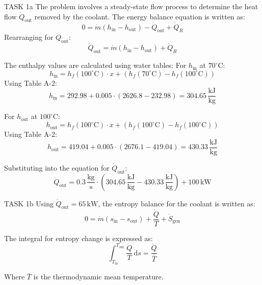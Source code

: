 TASK 1a  
The problem involves a steady-state flow process to determine the heat flow \( \dot{Q}_{\text{out}} \) removed by the coolant. The energy balance equation is written as:  
\[
0 = \dot{m} \left( h_{\text{in}} - h_{\text{out}} \right) - \dot{Q}_{\text{out}} + \dot{Q}_R
\]  
Rearranging for \( \dot{Q}_{\text{out}} \):  
\[
\dot{Q}_{\text{out}} = \dot{m} \left( h_{\text{in}} - h_{\text{out}} \right) + \dot{Q}_R
\]  

The enthalpy values are calculated using water tables:  
For \( h_{\text{in}} \) at \( 70^\circ\text{C} \):  
\[
h_{\text{in}} = h_f(100^\circ\text{C}) \cdot x + \left( h_f(70^\circ\text{C}) - h_f(100^\circ\text{C}) \right)
\]  
Using Table A-2:  
\[
h_{\text{in}} = 292.98 + 0.005 \cdot \left( 2626.8 - 232.98 \right) = 304.65 \, \frac{\text{kJ}}{\text{kg}}
\]  

For \( h_{\text{out}} \) at \( 100^\circ\text{C} \):  
\[
h_{\text{out}} = h_f(100^\circ\text{C}) \cdot x + \left( h_f(100^\circ\text{C}) - h_f(100^\circ\text{C}) \right)
\]  
Using Table A-2:  
\[
h_{\text{out}} = 419.04 + 0.005 \cdot \left( 2676.1 - 419.04 \right) = 430.33 \, \frac{\text{kJ}}{\text{kg}}
\]  

Substituting into the equation for \( \dot{Q}_{\text{out}} \):  
\[
\dot{Q}_{\text{out}} = 0.3 \, \frac{\text{kg}}{\text{s}} \cdot \left( 304.65 \, \frac{\text{kJ}}{\text{kg}} - 430.33 \, \frac{\text{kJ}}{\text{kg}} \right) + 100 \, \text{kW}
\]  

TASK 1b  
Using \( \dot{Q}_{\text{out}} = 65 \, \text{kW} \), the entropy balance for the coolant is written as:  
\[
0 = \dot{m} \left( s_{\text{in}} - s_{\text{out}} \right) + \frac{\dot{Q}}{T} + \dot{S}_{\text{gen}}
\]  

The integral for entropy change is expressed as:  
\[
\int_{T_{\text{in}}}^{T_{\text{out}}} \frac{\dot{Q}}{T} \, \text{d}s = \frac{\dot{Q}}{\bar{T}}
\]  

Where \( \bar{T} \) is the thermodynamic mean temperature.